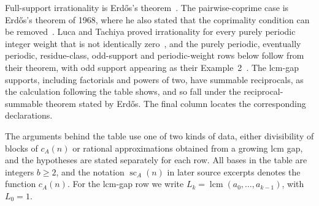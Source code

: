 \documentclass[11pt]{article}
\theoremstyle{plain}
\theoremstyle{definition}
\theoremstyle{remark}
\begin{document}
Full-support irrationality is Erd\H{o}s's theorem~\cite{erdos1948}.  The
pairwise-coprime case is Erd\H{o}s's theorem of 1968, where he also stated that
the coprimality condition can be removed~\cite[p.~222]{erdos1968}.  Luca and
Tachiya proved irrationality for every purely periodic integer weight that is
not identically zero~\cite[Theorem~A, p.~139]{lucatachiya2017}, and the purely
periodic, eventually periodic, residue-class, odd-support and periodic-weight
rows below follow from their theorem, with odd support appearing as their
Example~2~\cite[p.~140]{lucatachiya2017}. The lcm-gap supports, including
factorials and powers of two, have summable reciprocals, as the calculation
following the table shows, and so fall under the reciprocal-summable theorem
stated by Erd\H{o}s. The final column locates the corresponding
declarations.

The arguments behind the table use one of two kinds of data, either
divisibility of blocks of $c_A(n)$ or rational approximations obtained
from a growing lcm gap, and the hypotheses are stated separately for each
row. All bases in the table are integers $b\ge2$, and the notation
$\operatorname{sc}_A(n)$ in later source excerpts denotes the function
$c_A(n)$. For the lcm-gap row we write
$L_k=\operatorname{lcm}(a_0,\ldots,a_{k-1})$, with $L_0=1$.
\end{document}
